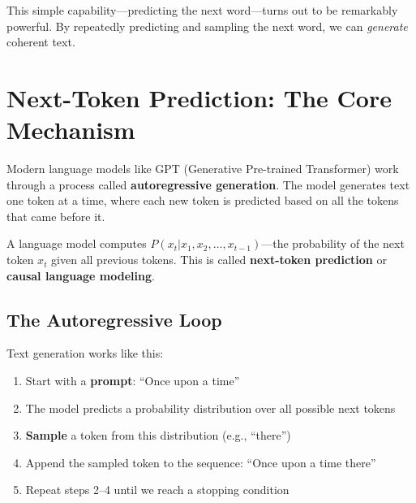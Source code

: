 This simple capability---predicting the next word---turns out to be remarkably powerful. By repeatedly predicting and sampling the next word, we can \textit{generate} coherent text.

\section{Next-Token Prediction: The Core Mechanism}

Modern language models like GPT (Generative Pre-trained Transformer) work through a process called \textbf{autoregressive generation}. The model generates text one token at a time, where each new token is predicted based on all the tokens that came before it.

\begin{keypoint}
A language model computes $P(x_t | x_1, x_2, \ldots, x_{t-1})$---the probability of the next token $x_t$ given all previous tokens. This is called \textbf{next-token prediction} or \textbf{causal language modeling}.
\end{keypoint}

\subsection{The Autoregressive Loop}

Text generation works like this:
\begin{enumerate}
    \item Start with a \textbf{prompt}: ``Once upon a time''
    \item The model predicts a probability distribution over all possible next tokens
    \item \textbf{Sample} a token from this distribution (e.g., ``there'')
    \item Append the sampled token to the sequence: ``Once upon a time there''
    \item Repeat steps 2--4 until we reach a stopping condition
\end{enumerate}


